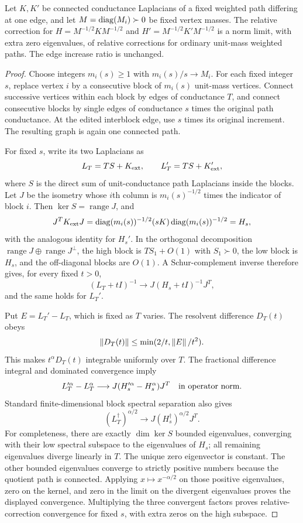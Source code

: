 \begin{lemma}\label{w:lem:blowup}
Let $K,K'$ be connected conductance Laplacians of a fixed weighted
path differing at one edge, and let $M=\operatorname{diag}(M_i)\succ0$ be fixed
vertex masses. The relative correction for
$H=M^{-1/2}KM^{-1/2}$ and $H'=M^{-1/2}K'M^{-1/2}$ is a norm limit,
with extra zero eigenvalues, of relative corrections for ordinary
unit-mass weighted paths. The edge increase ratio is unchanged.
\end{lemma}
\begin{proof}
Choose integers $m_i(s)\ge1$ with $m_i(s)/s\to M_i$.
For each fixed integer $s$, replace vertex $i$ by a consecutive block
of $m_i(s)$ unit-mass vertices. Connect successive vertices within
each block by edges of conductance $T$, and connect consecutive blocks
by single edges of conductance $s$ times the original path conductance.
At the edited interblock edge, use $s$ times its original increment.
The resulting graph is again one connected path.

For fixed $s$, write its two Laplacians as
\[
 L_T=TS+K_{\rm ext},\qquad
 L_T'=TS+K_{\rm ext}',
\]
where $S$ is the direct sum of unit-conductance path Laplacians
inside the blocks. Let $J$ be the isometry whose $i$th column is
$m_i(s)^{-1/2}$ times the indicator of block $i$.
Then $\ker S=\operatorname{range}J$, and
\[
 J^TK_{\rm ext}J
  =\operatorname{diag}(m_i(s))^{-1/2}(sK)\operatorname{diag}(m_i(s))^{-1/2}=H_s,
\]
with the analogous identity for $H_s'$.
In the orthogonal decomposition $\operatorname{range}J\oplus
\operatorname{range}J^\perp$, the high block is $TS_1+O(1)$ with
$S_1\succ0$, the low block is $H_s$, and the off-diagonal blocks are
$O(1)$. A Schur-complement inverse therefore gives, for every fixed
$t>0$,
\[
 (L_T+tI)^{-1}\longrightarrow J(H_s+tI)^{-1}J^T,
\]
and the same holds for $L_T'$.

Put $E=L_T'-L_T$, which is fixed as $T$ varies. The resolvent
difference $D_T(t)$ obeys
\[
 \left\lVert D_T(t)\right\rVert\le\min(2/t,\left\lVert E\right\rVert/t^2).
\]
This makes $t^\alpha D_T(t)$ integrable uniformly over $T$.
The fractional difference integral and dominated convergence imply
\[
 L_T'^\alpha-L_T^\alpha
       \longrightarrow J(H_s'^\alpha-H_s^\alpha)J^T
       \quad\hbox{in operator norm}.
\]
Standard finite-dimensional block spectral separation also gives
\[
 (L_T^\dagger)^{\alpha/2}
       \longrightarrow J(H_s^\dagger)^{\alpha/2}J^T.
\]
For completeness, there are exactly $\dim\ker S$ bounded
eigenvalues, converging with their low spectral subspace to the
eigenvalues of $H_s$; all remaining eigenvalues diverge linearly in
$T$. The unique zero eigenvector is constant. The other bounded
eigenvalues converge to strictly positive numbers because the quotient
path is connected. Applying $x\mapsto x^{-\alpha/2}$ on those
positive eigenvalues, zero on the kernel, and zero in the limit on
the divergent eigenvalues proves the displayed convergence.
Multiplying the three convergent factors proves relative-correction
convergence for fixed $s$, with extra zeros on the high subspace.


\end{proof}
